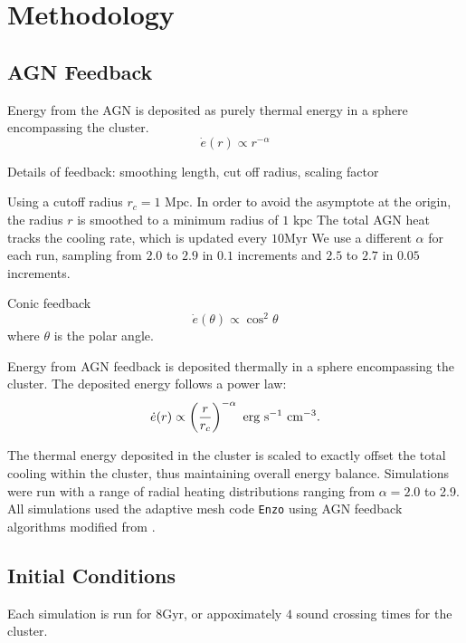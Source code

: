 \documentclass[iop,apjl, twocolappendix]{emulateapj}   %
\begin{document}
\section{Methodology}
\label{sec:methodology}

\subsection{AGN Feedback}
\textbullet Energy from the AGN is deposited as purely thermal energy in a sphere
encompassing the cluster.
\begin{equation}
	\dot{e}(r) \propto r^{-\alpha}
\end{equation}

\textbullet Details of feedback: smoothing length, cut off radius, scaling factor

Using a cutoff radius $r_c= 1\text{ Mpc}.$ In order to avoid the asymptote at
the origin, the radius $r$ is smoothed to a minimum radius of $1\text{ kpc}$
The total AGN heat tracks the cooling rate, which is updated every $10
\text{Myr}$ We use a different $\alpha$ for each run, sampling from $2.0$ to
$2.9$ in $0.1$ increments and $2.5$ to $2.7$ in $0.05$ increments.

\textbullet Conic feedback
\begin{equation}
	\dot{e}(\theta) \propto \cos^2 \theta 
\end{equation}
where $\theta$ is the polar angle.


Energy from AGN feedback is deposited thermally in a sphere encompassing the
cluster. The deposited energy follows a power law:
\vspace{-0.5em}
\begin{equation}
	\dot{e}(r) \propto \left( \frac{r}{r_c} \right )^{-\alpha} \text{ erg} \text{ s}^{-1} \text{ cm}^{-3}.
	\vspace{-0.5em}
\end{equation}

\noindent
The thermal energy deposited in the cluster is scaled to exactly offset the
total cooling within the cluster, thus maintaining overall energy balance.
Simulations were run with a range of radial heating distributions ranging from
$\alpha = 2.0$ to 2.9. 
All simulations used the adaptive mesh code \texttt{Enzo}
\cite{bryan_enzo:_2014} using AGN feedback algorithms modified from
\cite{meece_jr_agn_2016,meece_triggering_2017}.

\subsection{Initial Conditions}
\label{sec:initial_conditions}
\textbullet Each simulation is run for $8 \text{Gyr}$, or appoximately $4$ sound crossing
times for the cluster. 
\end{document}
